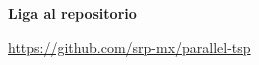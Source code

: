 \documentclass[main.tex]{subfiles}
\begin{document}
\vspace*{2mm}

\begin{cajaEnunciado}
    \textbf{Liga al repositorio}
\end{cajaEnunciado}

\begin{center}{\LARGE \href{https://github.com/srp-mx/parallel-tsp}{https://github.com/srp-mx/parallel-tsp}}\end{center}
\end{document}
